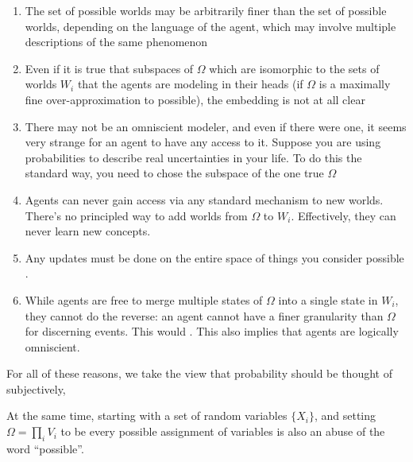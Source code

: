 \documentclass{article}
\newcommand\changed[1]{{\color{note-fg} #1}}
\begin{document}
	
	\begin{enumerate}
		\item \changed{The set of possible worlds may be arbitrarily finer than the set of possible worlds, depending on the language of the agent, which may involve multiple descriptions of the same phenomenon}
		
		\item Even if it is true that subspaces of $\Omega$ which are isomorphic to the sets of worlds $W_i$ that the agents are modeling in their heads (if $\Omega$ is a maximally fine over-approximation to possible), the embedding is not at all clear \todo{}
		
		\item There may not be an omniscient modeler, and even if there were one, it seems very strange for an agent to have any access to it. Suppose you are using probabilities to describe real uncertainties in your life. To do this the standard way, you need to chose the subspace of the one true $\Omega$ 
		
		\item Agents can never gain access via any standard mechanism to new worlds. There's no principled way to add worlds from $\Omega$ to $W_i$. Effectively, they can never learn new concepts.
		
		\item Any updates must be done on the entire space of things you consider possible .
		
		\item While agents are free to merge multiple states of $\Omega$ into a single state in $W_i$, they cannot do the reverse: an agent cannot have a finer granularity than $\Omega$ for discerning events. This would . This also implies that agents are logically omniscient.
	\end{enumerate}
	
	For all of these reasons, we take the view that probability should be thought of subjectively,
	
	
	At the same time, starting with a set of random variables $\{X_i\}$, and setting $\Omega = \prod_{i} V_i$ to be every possible assignment of variables is also an abuse of the word ``possible''.
	
\end{document}
